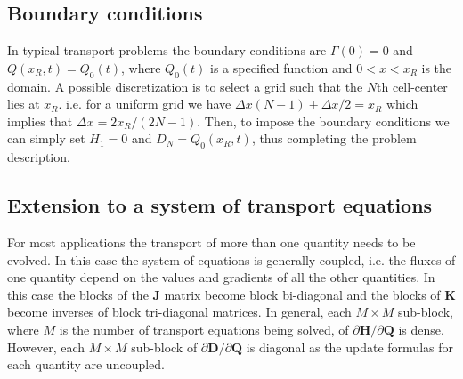 \documentclass[11pt]{article}
\newcommand{\pfracb}[2]{\partial #1/\partial #2}
\newcommand{\mvec}[1]{\mathbf{#1}}
\begin{document}
\subsection{Boundary conditions}

In typical transport problems the boundary conditions are $\Gamma(0) =
0$ and $Q(x_R,t) = Q_0(t)$, where $Q_0(t)$ is a specified function and
$0<x<x_R$ is the domain. A possible discretization is to select a grid
such that the $N$th cell-center lies at $x_R$. i.e.  for a uniform
grid we have $\Delta x (N-1) + \Delta x/2 = x_R$ which implies that
$\Delta x = 2x_R/(2N-1)$. Then, to impose the boundary conditions we
can simply set $H_1 = 0$ and $D_N = Q_0(x_R,t)$, thus completing the
problem description.

\subsection{Extension to a system of transport equations}

For most applications the transport of more than one quantity needs to
be evolved. In this case the system of equations is generally coupled,
i.e. the fluxes of one quantity depend on the values and gradients of
all the other quantities. In this case the blocks of the $\mvec{J}$
matrix become block bi-diagonal and the blocks of $\mvec{K}$ become
inverses of block tri-diagonal matrices. In general, each $M\times M$
sub-block, where $M$ is the number of transport equations being
solved, of $\pfracb{\mvec{H}}{\mvec{Q}}$ is dense. However, each
$M\times M$ sub-block of $\pfracb{\mvec{D}}{\mvec{Q}}$ is diagonal as
the update formulas for each quantity are uncoupled.
\end{document}
